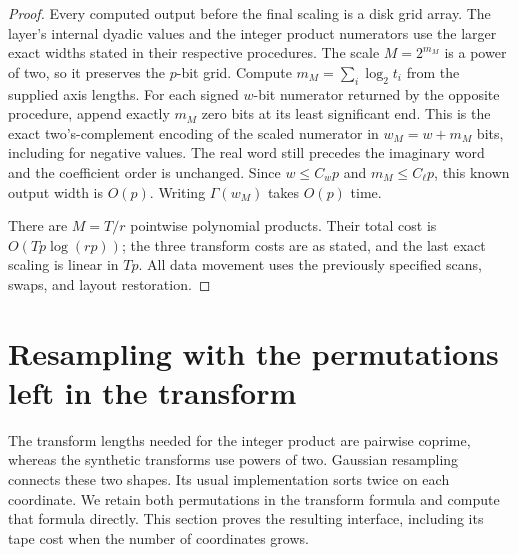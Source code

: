 \documentclass[11pt]{article}
\theoremstyle{definition}
\begin{document}
\begin{proof}
Every computed output before the final scaling is a disk grid array.
The layer's internal dyadic values and the integer product numerators
use the larger exact widths stated in their respective procedures.
The scale $M=2^{m_M}$ is a power of two, so it preserves the $p$-bit
grid. Compute $m_M=\sum_i\log_2t_i$ from the supplied axis lengths.
For each signed $w$-bit numerator returned by the opposite procedure,
append exactly $m_M$ zero bits at its least significant end. This is
the exact two's-complement encoding of the scaled numerator in
$w_M=w+m_M$ bits, including for negative values. The real word still
precedes the imaginary word and the coefficient order is unchanged.
Since $w\leq C_wp$ and $m_M\leq C_\ell p$, this known output width is
$O(p)$. Writing $\Gamma(w_M)$ takes $O(p)$ time.

There are $M=T/r$ pointwise polynomial products.  Their total cost
is $O(Tp\log(rp))$; the three transform costs are as stated, and
the last exact scaling is linear in $Tp$.  All data movement uses
the previously specified scans, swaps, and layout restoration.
\end{proof}
 \section{Resampling with the permutations left in the transform}
\label{sec:resampling}

The transform lengths needed for the integer product are pairwise coprime,
whereas the synthetic transforms use powers of two. Gaussian resampling
connects these two shapes. Its usual implementation sorts twice on each
coordinate. We retain both permutations in the transform formula and
compute that formula directly. This section proves the resulting interface,
including its tape cost when the number of coordinates grows.
\end{document}

